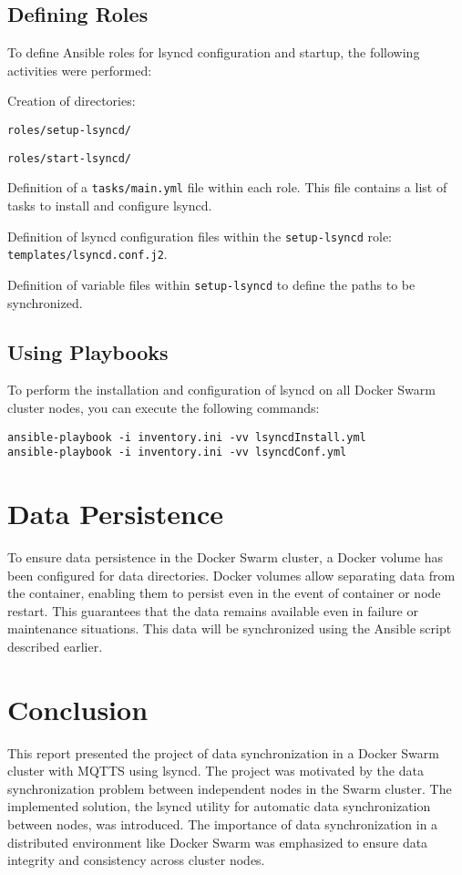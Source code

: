 \documentclass[a4paper, 12pt]{article}
\newenvironment{packed_itemize}{
\begin{itemize}
        \setlength{\itemsep}{1pt}
        \setlength{\parskip}{0pt}
        \setlength{\parsep}{0pt}
}{\end{itemize}}
\begin{document}
\subsection{Defining Roles}
To define Ansible roles for lsyncd configuration and startup, the following 
activities were performed:
\begin{packed_itemize}
  \item Creation of directories:
  \begin{packed_itemize}
    \item \texttt{roles/setup-lsyncd/}
    \item \texttt{roles/start-lsyncd/}
  \end{packed_itemize}
  \item Definition of a \texttt{tasks/main.yml} file within each role. This file 
    contains a list of tasks to install and configure lsyncd.
  \item Definition of lsyncd configuration files within the \texttt{setup-lsyncd} 
    role: \texttt{templates/lsyncd.conf.j2}.
  \item Definition of variable files within \texttt{setup-lsyncd} to define the paths 
    to be synchronized.
\end{packed_itemize}

\subsection{Using Playbooks}
To perform the installation and configuration of lsyncd on all Docker Swarm cluster nodes, 
you can execute the following commands:
\begin{lstlisting}
ansible-playbook -i inventory.ini -vv lsyncdInstall.yml
ansible-playbook -i inventory.ini -vv lsyncdConf.yml
\end{lstlisting}

\section{Data Persistence}
To ensure data persistence in the Docker Swarm cluster, a Docker volume has been 
configured for data directories. Docker volumes allow separating data from the container, 
enabling them to persist even in the event of container or node restart. This guarantees 
that the data remains available even in failure or maintenance situations. This data will 
be synchronized using the Ansible script described earlier.

\section{Conclusion}
This report presented the project of data synchronization in a Docker Swarm cluster 
with MQTTS using lsyncd. The project was motivated by the data synchronization problem 
between independent nodes in the Swarm cluster. The implemented solution, the 
lsyncd utility for automatic data synchronization between nodes, was introduced. 
The importance of data synchronization in a distributed environment like Docker 
Swarm was emphasized to ensure data integrity and consistency across cluster nodes.
\end{document}
